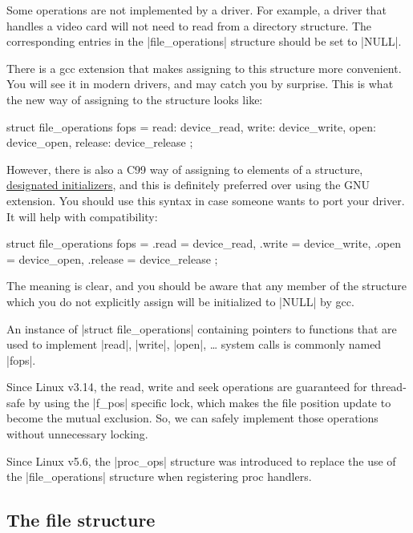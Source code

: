 \documentclass[10pt, oneside]{book}
\begin{document}
Some operations are not implemented by a driver.
For example, a driver that handles a video card will not need to read from a directory structure.
The corresponding entries in the \cpp|file_operations| structure should be set to \cpp|NULL|.

There is a gcc extension that makes assigning to this structure more convenient.
You will see it in modern drivers, and may catch you by surprise.
This is what the new way of assigning to the structure looks like:

\begin{code}
struct file_operations fops = {
	read: device_read,
	write: device_write,
	open: device_open,
	release: device_release
};
\end{code}

However, there is also a C99 way of assigning to elements of a structure, \href{https://gcc.gnu.org/onlinedocs/gcc/Designated-Inits.html}{designated initializers}, and this is definitely preferred over using the GNU extension.
You should use this syntax in case someone wants to port your driver.
It will help with compatibility:

\begin{code}
struct file_operations fops = {
	.read = device_read,
	.write = device_write,
	.open = device_open,
	.release = device_release
};
\end{code}

The meaning is clear, and you should be aware that any member of the structure which you do not explicitly assign will be initialized to \cpp|NULL| by gcc.

An instance of \cpp|struct file_operations| containing pointers to functions that are used to implement \cpp|read|, \cpp|write|, \cpp|open|, \ldots{} system calls is commonly named \cpp|fops|.

Since Linux v3.14, the read, write and seek operations are guaranteed for thread-safe by using the \cpp|f_pos| specific lock, which makes the file position update to become the mutual exclusion.
So, we can safely implement those operations without unnecessary locking.

Since Linux v5.6, the \cpp|proc_ops| structure was introduced to replace the use of the \cpp|file_operations| structure when registering proc handlers.

\subsection{The file structure}
\label{sec:file_struct}
\end{document}
